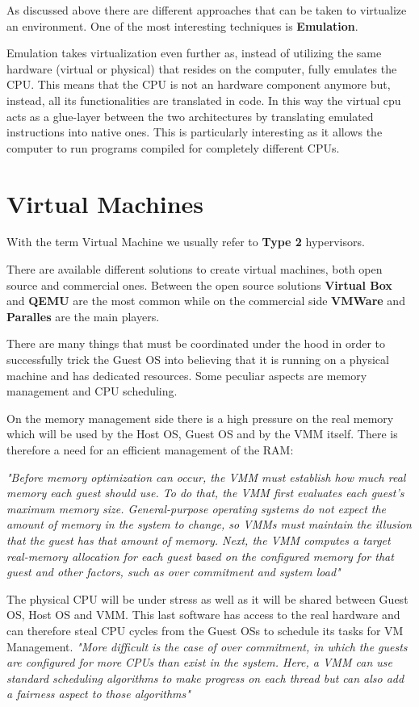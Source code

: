 As discussed above there are different approaches that can be taken to virtualize an environment. One of the most interesting techniques is \textbf{Emulation}. 

Emulation takes virtualization even further as, instead of utilizing the same hardware (virtual or physical) that resides on the computer, fully emulates the CPU. This means that the CPU is not an hardware component anymore but, instead, all its functionalities are translated in code. 
In this way the virtual cpu acts as a glue-layer between the two architectures by translating emulated instructions into native ones. This is particularly interesting as it allows the computer to run programs compiled for completely different CPUs. 

\section{Virtual Machines}

With the term Virtual Machine we usually refer to \textbf{Type 2} hypervisors.

There are available different solutions to create virtual machines, both open source and commercial ones. Between the open source solutions \textbf{Virtual Box} and \textbf{QEMU} are the most common while on the commercial side \textbf{VMWare} and \textbf{Paralles} are the main players. 

There are many things that must be coordinated under the hood in order to successfully trick the Guest OS into believing that it is running on a physical machine and has dedicated resources. Some peculiar aspects are memory management and CPU scheduling.

On the memory management side there is a high pressure on the real memory which will be used by the Host OS, Guest OS and by the VMM itself. There is therefore a need for an efficient management of the RAM:

\textit{"Before memory optimization can occur, the VMM must establish how much real memory each guest should use. To do that, the VMM first evaluates each guest’s maximum memory size. General-purpose operating systems do not expect the amount of memory in the system to change, so VMMs must maintain the illusion that the guest has that amount of memory. Next, the VMM computes a target real-memory allocation for each guest based on the configured memory for that guest and other factors, such as over commitment and system load"}\cite{os}

The physical CPU will be under stress as well as it will be shared between Guest OS, Host OS and VMM. This last software has access to the real hardware and can therefore steal CPU cycles from the Guest OSs to schedule its tasks for VM Management.
\textit{"More difficult is the case of over commitment, in which the guests are configured for more CPUs than exist in the system. Here, a VMM can use standard scheduling algorithms to make progress on each thread but can also add a fairness aspect to those algorithms"}\cite{os}

